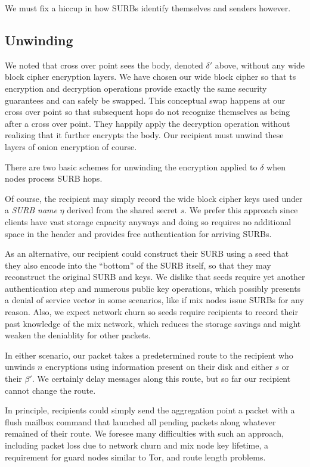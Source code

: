 \documentclass[twoside,letterpaper]{llncs}
\begin{document}
We must fix a hiccup in how SURBs identify themselves and senders
however.

\subsection{Unwinding}

We noted that cross over point sees the body, denoted $\delta'$
above, without any wide block cipher encryption layers.  We have
chosen our wide block cipher so that ts encryption and decryption
operations provide exactly the same security guarantees and can
safely be swapped.  This conceptual swap happens at our cross over
point so that subsequent hops do not recognize themselves as being
after a cross over point.  They happily apply the decryption
operation without realizing that it further encrypts the body.
Our recipient must unwind these layers of onion encryption of course.

There are two basic schemes for unwinding the encryption applied to
$\delta$ when nodes process SURB hops.  

Of course, the recipient may simply record the wide block cipher 
keys used under a {\it SURB name} $\eta$ derived from the shared
secret $s$.  We prefer this approach since clients have vast storage
capacity anyways and doing so requires no additional space in the
header and provides free authentication for arriving SURBs.  

As an alternative, our recipient could construct their SURB using 
a seed that they also encode into the ``bottom'' of the SURB itself,
so that they may reconstruct the original SURB and keys.
We dislike that seeds require yet another authentication step and
numerous public key operations, which possibly presents a denial of
service vector in some scenarios, like if mix nodes issue SURBs for
any reason.  Also, we expect network churn so seeds require 
recipients to record their past knowledge of the mix network, which
reduces the storage savings and might weaken the deniablity for
other packets.

In either scenario, our packet takes a predetermined route to the
recipient who unwinds $n$ encryptions using information present on
their disk and either $s$ or their $\beta'$.  We certainly delay
messages along this route, but so far our recipient cannot change
the route. 

In principle, recipients could simply send the aggregation point
a packet with a flush mailbox command that launched all pending
packets along whatever remained of their route.  We foresee many
difficulties with such an approach, including packet loss due to
network churn and mix node key lifetime, a requirement for guard
nodes similar to Tor, and route length problems.
\end{document}
